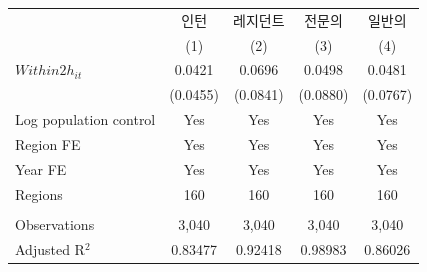 \begingroup
\centering
\begin{tabular}{lcccc}
   \toprule
                          & 인턴     & 레지던트 & 전문의   & 일반의 \\   
                          & (1)      & (2)      & (3)      & (4)\\  
   \midrule 
   $Within2h_{it}$        & 0.0421   & 0.0696   & 0.0498   & 0.0481\\   
                          & (0.0455) & (0.0841) & (0.0880) & (0.0767)\\   
   Log population control & Yes      & Yes      & Yes      & Yes\\  
   Region FE              & Yes      & Yes      & Yes      & Yes\\  
   Year FE                & Yes      & Yes      & Yes      & Yes\\  
   Regions                & 160      & 160      & 160      & 160\\  
    \\
   Observations           & 3,040    & 3,040    & 3,040    & 3,040\\  
   Adjusted R$^2$         & 0.83477  & 0.92418  & 0.98983  & 0.86026\\  
   \bottomrule
\end{tabular}
\par\endgroup
